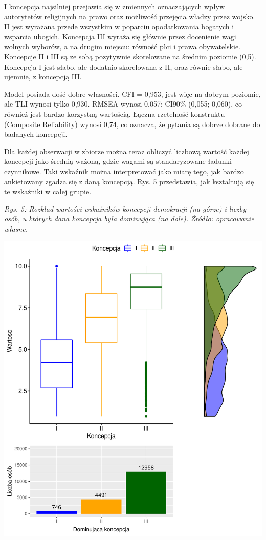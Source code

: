 \documentclass[12pt]{article}
\begin{document}
I koncepcja najsilniej przejawia się w zmiennych oznaczających wpływ autorytetów religijnych na prawo oraz możliwość przejęcia władzy przez wojsko. II jest wyrażana przede wszystkim w poparciu opodatkowania bogatych i wsparcia ubogich. Koncepcja III wyraża się głównie przez docenienie wagi wolnych wyborów, a na drugim miejscu: równość płci i prawa obywatelskie. Koncepcje II i III są ze sobą pozytywnie skorelowane na średnim poziomie (0,5). Koncepcja I jest słabo, ale dodatnio skorelowana z II, oraz równie słabo, ale ujemnie, z koncepcją III.

Model posiada dość dobre własności. CFI = 0,953, jest więc na dobrym poziomie, ale TLI wynosi tylko 0,930. RMSEA wynosi 0,057; CI90\% (0,055; 0,060), co również jest bardzo korzystną wartością. Łączna rzetelność konstruktu (Composite Reliability) wynosi 0,74, co oznacza, że pytania są dobrze dobrane do badanych koncepcji.

Dla każdej obserwacji w zbiorze można teraz obliczyć liczbową wartość każdej koncepcji jako średnią ważoną, gdzie wagami są standaryzowane ładunki czynnikowe. Taki wskaźnik można interpretować jako miarę tego, jak bardzo ankietowany zgadza się z daną koncepcją. Rys. 5 przedstawia, jak kształtują się te wskaźniki w całej grupie.

\emph{Rys. 5: Rozkład wartości wskaźników koncepcji demokracji (na górze) i liczby osób, u których dana koncepcja była dominująca (na dole). Źródło: opracowanie własne.}

\begin{center}\includegraphics{text_ASA_files/figure-latex/stats-all-1} \end{center}
\end{document}
